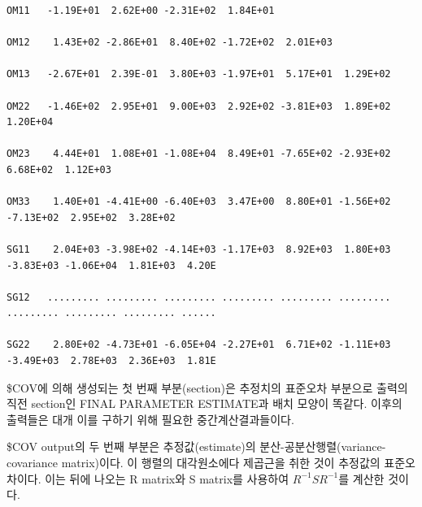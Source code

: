 \documentclass[
  10pt,
]{krantz}
\begin{document}
\begin{verbatim}
OM11   -1.19E+01  2.62E+00 -2.31E+02  1.84E+01                                                         
                                                                                                       
OM12    1.43E+02 -2.86E+01  8.40E+02 -1.72E+02  2.01E+03                                               
                                                                                                       
OM13   -2.67E+01  2.39E-01  3.80E+03 -1.97E+01  5.17E+01  1.29E+02                                     
                                                                                                       
OM22   -1.46E+02  2.95E+01  9.00E+03  2.92E+02 -3.81E+03  1.89E+02  1.20E+04                           
                                                                                                       
OM23    4.44E+01  1.08E+01 -1.08E+04  8.49E+01 -7.65E+02 -2.93E+02  6.68E+02  1.12E+03                 
                                                                                                       
OM33    1.40E+01 -4.41E+00 -6.40E+03  3.47E+00  8.80E+01 -1.56E+02 -7.13E+02  2.95E+02  3.28E+02       
                                                                                                       
SG11    2.04E+03 -3.98E+02 -4.14E+03 -1.17E+03  8.92E+03  1.80E+03 -3.83E+03 -1.06E+04  1.81E+03  4.20E
                                                                                                       
SG12   ......... ......... ......... ......... ......... ......... ......... ......... ......... ......
                                                                                                       
SG22    2.80E+02 -4.73E+01 -6.05E+04 -2.27E+01  6.71E+02 -1.11E+03 -3.49E+03  2.78E+03  2.36E+03  1.81E
\end{verbatim}

\$COV에 의해 생성되는 첫 번째 부분(section)은 추정치의 표준오차 부분으로 출력의 직전 section인 FINAL
PARAMETER ESTIMATE과 배치 모양이 똑같다. 이후의 출력들은 대개 이를 구하기 위해 필요한 중간계산결과들이다.

\$COV output의 두 번째 부분은 추정값(estimate)의 분산-공분산행렬(variance-covariance
matrix)이다. 이 행렬의 대각원소에다 제곱근을 취한 것이 추정값의 표준오차이다. 이는 뒤에 나오는 R matrix와 S
matrix를 사용하여 \(R^{- 1}SR^{- 1}\)를 계산한 것이다.
\end{document}
